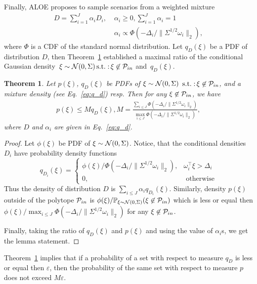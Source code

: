\documentclass{IEEEtran4PSCC}
\newtheorem{theorem}{Theorem}[section]
\DeclareMathOperator*{\st}{s.t.:}
\newcommand{\cP}{{\cal P}}
\newcommand{\cN}{{\cal N}}
\begin{document}
Finally, ALOE proposes to sample scenarios from a weighted mixture
\begin{align}
\label{eq:q_d}
  D = \sum_{i=1}^J \alpha_i D_i, \; & \alpha_i \ge 0, \sum_{i=1}^J \alpha_i = 1 \nonumber 
  \\& \alpha_i \propto \Phi(-\Delta_i/\|\Sigma^{1/2}\omega_i\|_2),
\end{align}
where $\Phi$ is a CDF of the standard normal distribution. Let $q_D(\xi)$ be a PDF of distribution $D$, then Theorem~\ref{thm:50} established a maximal ratio of the conditional Gaussian density~$\xi\sim\cN(0, \Sigma) \st \xi\not\in\cP_{in}$ and~$q_D(\xi)$. 
\begin{theorem}\label{thm:50}
Let $p(\xi)$, $q_D(\xi)$ be PDFs of $\xi\sim\cN(0, \Sigma)$ $\st \xi\not\in\cP_{in}$, and a mixture density (see Eq.~\eqref{eq:q_d}) resp. Then for any $\xi\not\in\cP_{in}$, we have
\begin{align}\label{eq:M}
  p(\xi) \le M q_D(\xi), M = \frac{\sum_{i\le J} \Phi(-\Delta_i/\|\Sigma^{1/2}\omega_i\|_2)
  }{\max_{i\le J}\Phi(-\Delta_i/\|\Sigma^{1/2}\omega_i\|_2)}, 
\end{align}
where $D$ and $\alpha_i$ are given in Eq.~\eqref{eq:q_d}.
\end{theorem}
\begin{proof}
Let $\phi(\xi)$ be PDF of $\xi\sim\cN(0, \Sigma)$. Notice, that the conditional densities $D_i$ have probability density functions 
\[q_{D_i}(\xi) = \begin{cases}
\phi(\xi)/\Phi(-\Delta_i/\|\Sigma^{1/2}\omega_i\|_2), & \omega_i^\top \xi > \Delta_i\\
0, & \text{ otherwise}
\end{cases}
\]
Thus the density of distribution $D$ is $\sum_{i\le J} \alpha_iq_{D_i}(\xi)$. Similarly, density $p(\xi)$ outside of the polytope $\cP_{in}$ is $\phi(\xi)/\mathbb{P}_{\xi\sim \cN(0, \Sigma)}(\xi\not\in \cP_{in})$ which is less or equal then
$\phi(\xi)/\max_{i\le J}\Phi(-\Delta_i/\|\Sigma^{1/2}\omega_i\|_2)$ for any $\xi \not\in \cP_{in}$. 

Finally, taking the ratio of $q_D(\xi)$ and $p(\xi)$ and using the value of $\alpha_i$s, we get the lemma statement.
\end{proof}

Theorem~\ref{thm:50} implies that if a probability of a set with respect to measure $q_D$ is less or equal then $\varepsilon$, then the probability of the same set with respect to measure $p$ does not exceed $M\varepsilon$. %
\end{document}
